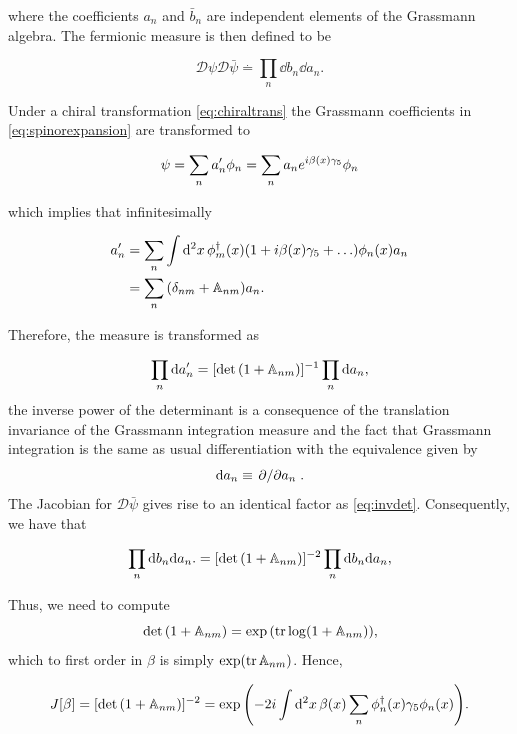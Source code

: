 where the coefficients $a_n$ and $\bar b_n$ are independent elements of the Grassmann algebra. The fermionic measure is then defined to be 

\begin{equation}
\mathcal{D}\psi\mathcal{D}\bar\psi \overset{.}{=}\prod_{n}\dd b_n\dd a_n.
\end{equation}

Under a chiral transformation \eqref{eq:chiraltrans} the Grassmann coefficients in \eqref{eq:spinorexpansion} are transformed to

\begin{equation}
\psi = \sum_n a_n' \phi_n = \sum_n a_n e^{i\beta(x)\gamma_5 }\phi_n
\end{equation}

which implies that infinitesimally

\begin{align}
	a_n' &= \sum_n \int \dd[2]{x}\phi_m^\dagger(x)(1 + i\beta(x)\gamma_5 + \ldots)\phi_n(x) a_n\nonumber\\
	&= \sum_n\qty(\delta_{nm} + \mathbb{A}_{nm})a_n.
\end{align}

Therefore, the measure is transformed as

\begin{equation}
\prod_n \dd a'_n = [\det\qty(1+\mathbb{A}_{nm})]^{-1} \prod_n \dd a_n,
\label{eq:invdet}
\end{equation}
the inverse power of the determinant is a consequence of the translation invariance of the Grassmann integration measure and the fact that Grassmann integration is the same as usual differentiation with the equivalence given by $$\dd a_n \equiv \pdv*{}{a_n}.$$ The Jacobian for $\mathcal{D}\bar\psi$ gives rise to an identical factor as \eqref{eq:invdet}. Consequently, we have that

\begin{equation}
    \prod_{n}\dd b_n\dd a_n. = [\det\qty(1+\mathbb{A}_{nm})]^{-2} \prod_n \dd b_n \dd a_n,
\end{equation}

Thus, we need to compute $$\det\qty(1+\mathbb{A}_{nm}) = \exp\qty({\tr\log(1+\mathbb{A}_{nm})}),$$ which to first order in $\beta$ is simply $\exp(\tr\mathbb{A}_{nm})$. Hence,

\begin{equation}
    J[\beta] = [\det\qty(1+\mathbb{A}_{nm})]^{-2} = \exp\qty(-2i\int \dd[2]{x}\beta(x)\sum_n \phi_n^\dagger(x) \gamma_5 \phi_n(x)).
    \label{eq:determinant}
\end{equation}

